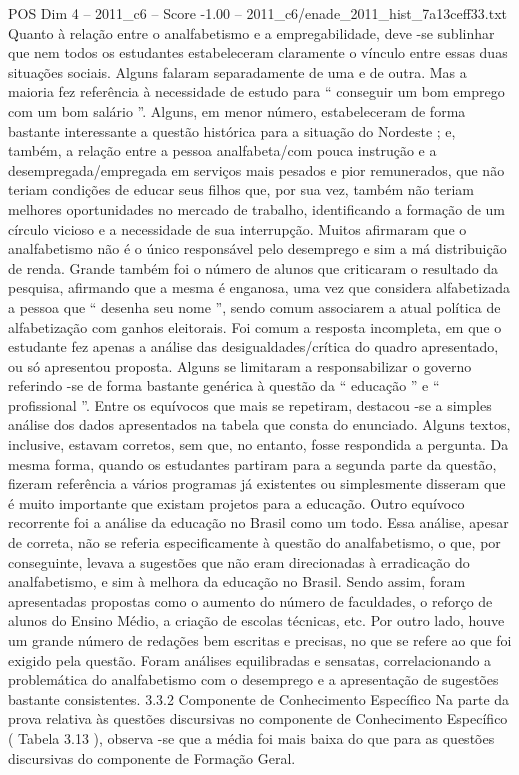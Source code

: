 \begin{textsample}{POS Dim 4 – 2011\_c6 – Score -1.00 – 2011\_c6/enade\_2011\_hist\_7a13ceff33.txt}
Quanto à relação entre o analfabetismo e a empregabilidade, deve -se sublinhar que nem todos os estudantes estabeleceram claramente o vínculo entre essas duas situações sociais.
Alguns falaram separadamente de uma e de outra.
Mas a maioria fez referência à necessidade de estudo para “ conseguir um bom emprego com um bom salário ”.
Alguns, em menor número, estabeleceram de forma bastante interessante a questão histórica para a situação do Nordeste ; e, também, a relação entre a pessoa analfabeta/com pouca instrução e a desempregada/empregada em serviços mais pesados e pior remunerados, que não teriam condições de educar seus filhos que, por sua vez, também não teriam melhores oportunidades no mercado de trabalho, identificando a formação de um círculo vicioso e a necessidade de sua interrupção.
Muitos afirmaram que o analfabetismo não é o único responsável pelo desemprego e sim a má distribuição de renda.
Grande também foi o número de alunos que criticaram o resultado da pesquisa, afirmando que a mesma é enganosa, uma vez que considera alfabetizada a pessoa que “ desenha seu nome ”, sendo comum associarem a atual política de alfabetização com ganhos eleitorais.
Foi comum a resposta incompleta, em que o estudante fez apenas a análise das desigualdades/crítica do quadro apresentado, ou só apresentou proposta.
Alguns se limitaram a responsabilizar o governo referindo -se de forma bastante genérica à questão da “ educação ” e “ profissional ”.
Entre os equívocos que mais se repetiram, destacou -se a simples análise dos dados apresentados na tabela que consta do enunciado.
Alguns textos, inclusive, estavam corretos, sem que, no entanto, fosse respondida a pergunta.
Da mesma forma, quando os estudantes partiram para a segunda parte da questão, fizeram referência a vários programas já existentes ou simplesmente disseram que é muito importante que existam projetos para a educação.
Outro equívoco recorrente foi a análise da educação no Brasil como um todo.
Essa análise, apesar de correta, não se referia especificamente à questão do analfabetismo, o que, por conseguinte, levava a sugestões que não eram direcionadas à erradicação do analfabetismo, e sim à melhora da educação no Brasil.
Sendo assim, foram apresentadas propostas como o aumento do número de faculdades, o reforço de alunos do Ensino Médio, a criação de escolas técnicas, etc.
Por outro lado, houve um grande número de redações bem escritas e precisas, no que se refere ao que foi exigido pela questão.
Foram análises equilibradas e sensatas, correlacionando a problemática do analfabetismo com o desemprego e a apresentação de sugestões bastante consistentes. 3.3.2 Componente de Conhecimento Específico Na parte da prova relativa às questões discursivas no componente de Conhecimento Específico ( Tabela 3.13 ), observa -se que a média foi mais baixa do que para as questões discursivas do componente de Formação Geral.

\end{textsample}
